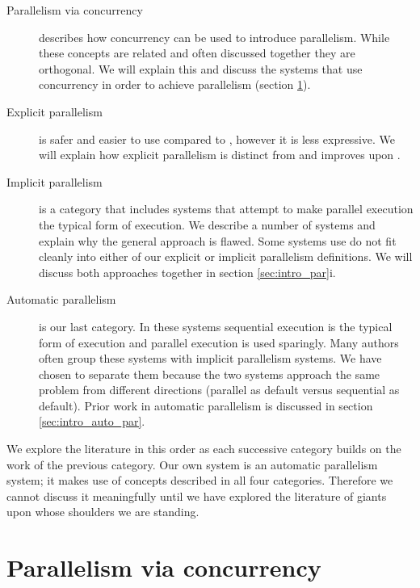 \begin{description}
    \item[Parallelism via concurrency] describes how
    concurrency can be used to introduce parallelism.
    While these concepts are related and often discussed together they are
    orthogonal.
    We will explain this and discuss the systems that use concurrency in
    order to achieve parallelism
    (section \ref{sec:intro_concurrency}).

    \item[Explicit parallelism] is safer and easier to use compared to
    \pvc, however it is less expressive.
    We will explain how explicit parallelism is distinct from and improves
    upon \pvc.

    \item[Implicit parallelism] is a category that includes
    systems that attempt to make parallel execution the typical form of
    execution.
    We describe a number of systems and explain why the general approach is
    flawed.
    Some systems use do not fit cleanly into either of our explicit
    or implicit parallelism definitions.
    We will discuss both approaches together in section
    \ref{sec:intro_par}i.

    \item[Automatic parallelism] is our last category.
    In these systems sequential execution is the typical form of execution
    and parallel execution is used sparingly.
    Many authors often group these systems with implicit parallelism systems.
    We have chosen to separate them because the two systems
    approach the same problem from different directions
    (parallel as default versus sequential as default).
    Prior work in automatic parallelism is discussed in section
    \ref{sec:intro_auto_par}.
\end{description}

\noindent
We explore the literature in this order as each successive category builds
on the work of the previous category.
Our own system is an automatic parallelism system;
it makes use of concepts described in all four categories.
Therefore
we cannot discuss it meaningfully until we have explored the literature
of giants upon whose shoulders we are standing.


\section{Parallelism via concurrency}
\label{sec:intro_concurrency}

